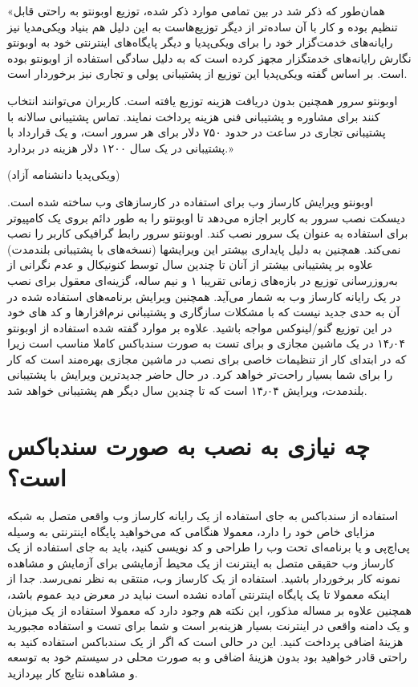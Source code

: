 «همان‌طور که ذکر شد در بین تمامی موارد ذکر شده، توزیع اوبونتو به راحتی قابل تنظیم بوده و کار با آن ساده‌تر از دیگر توزیع‌هاست به این دلیل هم بنیاد ویکی‌مدیا نیز رایانه‌های خدمت‌گزار خود را برای ویکی‌پدیا و دیگر پایگاه‌های اینترنتی خود به اوبونتو نگارش رایانه‌های خدمتگزار مجهز کرده است که به دلیل سادگی استفاده از اوبونتو بوده است. بر اساس گفته ویکی‌پدیا این توزیع از پشتیبانی پولی و تجاری نیز برخوردار است.

اوبونتو سرور همچنین بدون دریافت هزینه توزیع یافته است. کاربران می‌توانند انتخاب کنند برای مشاوره و پشتیبانی فنی هزینه پرداخت نمایند. تماس پشتیبانی سالانه با پشتیبانی تجاری 
 در ساعت در حدود ۷۵۰ دلار برای هر سرور است، و یک قرارداد با پشتیبانی 
 در یک سال ۱۲۰۰ دلار هزینه در بردارد.» 
 
\begin{flushleft}
    (ویکی‌پدیا دانشنامه آزاد)
\end{flushleft}

اوبونتو ویرایش کارساز وب برای استفاده در کارسازهای وب ساخته شده است. دیسکت نصب سرور به کاربر اجازه می‌دهد تا اوبونتو را به طور دائم بروی یک کامپیوتر برای استفاده به عنوان یک سرور نصب کند. اوبونتو سرور رابط گرافیکی کاربر را نصب نمی‌کند. همچنین به دلیل پایداری بیشتر این ویرایشها (نسخه‌های با پشتیبانی بلند‌مدت) علاوه بر پشتیبانی بیشتر از آنان تا چندین سال توسط کنونیکال و عدم نگرانی از به‌روزرسانی توزیع در بازه‌های زمانی تقریبا ۱ و نیم ساله، گزینه‌ای معقول برای نصب در یک رایانه کارساز وب به شمار می‌آید. همچنین ویرایش برنامه‌های استفاده شده در آن به حدی جدید نیست که با مشکلات سازگاری و پشتیبانی نرم‌افزارها و کد های خود در این توزیع گنو/لینوکس مواجه باشید. علاوه بر موارد گفته شده استفاده از اوبونتو ۱۴٫۰۴ در یک ماشین مجازی و برای تست به صورت سند‌باکس کاملا مناسب است زیرا که در ابتدای کار از تنظیمات خاصی برای نصب در ماشین مجازی بهره‌مند است که کار را برای شما بسیار راحت‌تر خواهد کرد. در حال حاضر جدیدترین ویرایش با پشتیبانی بلند‌مدت، ویرایش ۱۴٫۰۴ است که تا چندین سال دیگر هم پشتیبانی خواهد شد.
\section{چه نیازی به نصب به صورت سند‌باکس است؟}
استفاده از سند‌باکس به جای استفاده از یک رایانه کارساز وب واقعی متصل به شبکه مزایای خاص خود را دارد، معمولا هنگامی که می‌خواهید پایگاه اینترنتی به وسیله پی‌اچ‌پی و یا برنامه‌ای تحت وب را طراحی و کد نویسی کنید، باید به جای استفاده از یک کارساز وب حقیقی متصل به اینترنت از یک محیط آزمایشی برای آزمایش و مشاهده نمونه کار برخوردار باشید. استفاده از یک کارساز وب، منتقی به نظر نمی‌رسد. جدا از اینکه معمولا تا یک پایگاه اینترنتی آماده نشده است نباید در معرض دید عموم باشد، همچنین علاوه بر مساله مذکور، این نکته هم وجود دارد که معمولا استفاده از یک میزبان و یک دامنه واقعی در اینترنت بسیار هزینه‌بر است و شما برای تست و استفاده مجبورید هزینهٔ اضافی پرداخت کنید. این در حالی است که اگر از یک سند‌باکس استفاده کنید به راحتی قادر خواهید بود بدون هزینهٔ اضافی و به صورت محلی در سیستم خود به توسعه و مشاهده نتایج کار بپردازید.


